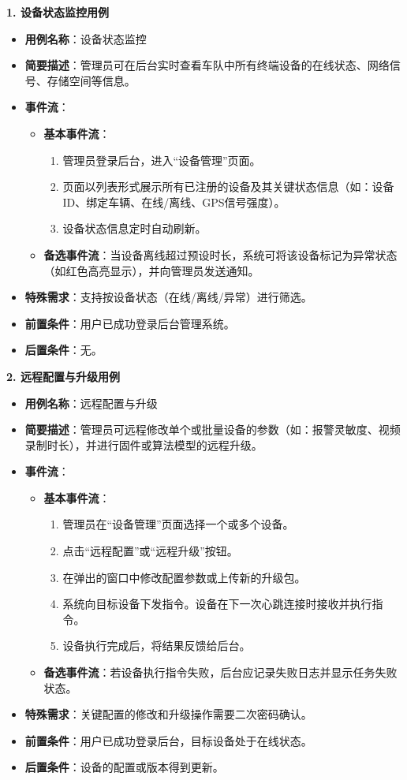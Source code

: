 \documentclass[a4paper,12pt]{article}
\begin{document}
\textbf{1. 设备状态监控用例}
\begin{itemize}
    \item \textbf{用例名称}：设备状态监控
    \item \textbf{简要描述}：管理员可在后台实时查看车队中所有终端设备的在线状态、网络信号、存储空间等信息。
    \item \textbf{事件流}：
    \begin{itemize}
        \item \textbf{基本事件流}：
        \begin{enumerate}
            \item 管理员登录后台，进入“设备管理”页面。
            \item 页面以列表形式展示所有已注册的设备及其关键状态信息（如：设备ID、绑定车辆、在线/离线、GPS信号强度）。
            \item 设备状态信息定时自动刷新。
        \end{enumerate}
        \item \textbf{备选事件流}：当设备离线超过预设时长，系统可将该设备标记为异常状态（如红色高亮显示），并向管理员发送通知。
    \end{itemize}
    \item \textbf{特殊需求}：支持按设备状态（在线/离线/异常）进行筛选。
    \item \textbf{前置条件}：用户已成功登录后台管理系统。
    \item \textbf{后置条件}：无。
\end{itemize}

\textbf{2. 远程配置与升级用例}
\begin{itemize}
    \item \textbf{用例名称}：远程配置与升级
    \item \textbf{简要描述}：管理员可远程修改单个或批量设备的参数（如：报警灵敏度、视频录制时长），并进行固件或算法模型的远程升级。
    \item \textbf{事件流}：
    \begin{itemize}
        \item \textbf{基本事件流}：
        \begin{enumerate}
            \item 管理员在“设备管理”页面选择一个或多个设备。
            \item 点击“远程配置”或“远程升级”按钮。
            \item 在弹出的窗口中修改配置参数或上传新的升级包。
            \item 系统向目标设备下发指令。设备在下一次心跳连接时接收并执行指令。
            \item 设备执行完成后，将结果反馈给后台。
        \end{enumerate}
        \item \textbf{备选事件流}：若设备执行指令失败，后台应记录失败日志并显示任务失败状态。
    \end{itemize}
    \item \textbf{特殊需求}：关键配置的修改和升级操作需要二次密码确认。
    \item \textbf{前置条件}：用户已成功登录后台，目标设备处于在线状态。
    \item \textbf{后置条件}：设备的配置或版本得到更新。
\end{itemize}
\end{document}
